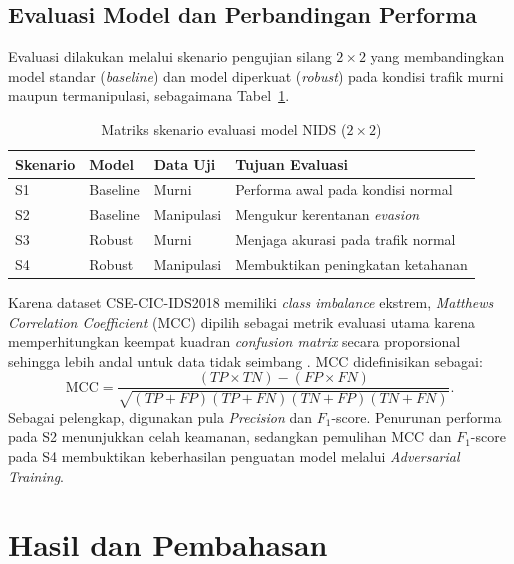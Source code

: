 \documentclass[10pt,twocolumn,a4paper]{extarticle}
\begin{document}
\subsection{Evaluasi Model dan Perbandingan Performa}
Evaluasi dilakukan melalui skenario pengujian silang $2\times 2$ yang membandingkan model standar (\textit{baseline}) dan model diperkuat (\textit{robust}) pada kondisi trafik murni maupun termanipulasi, sebagaimana Tabel~\ref{tab:skenario_2x2}.

\begin{table}[htbp]
\caption{Matriks skenario evaluasi model NIDS ($2\times 2$)}
\label{tab:skenario_2x2}
\centering
\footnotesize
\begin{tabularx}{\linewidth}{@{} l l l X @{}}
\toprule
\textbf{Skenario} & \textbf{Model} & \textbf{Data Uji} & \textbf{Tujuan Evaluasi} \\ \midrule
S1 & Baseline & Murni & Performa awal pada kondisi normal \\
S2 & Baseline & Manipulasi & Mengukur kerentanan \textit{evasion} \\
S3 & Robust & Murni & Menjaga akurasi pada trafik normal \\
S4 & Robust & Manipulasi & Membuktikan peningkatan ketahanan \\ \bottomrule
\end{tabularx}
\end{table}

Karena dataset CSE-CIC-IDS2018 memiliki \textit{class imbalance} ekstrem, \textit{Matthews Correlation Coefficient} (MCC) \citep{ref_matthews} dipilih sebagai metrik evaluasi utama karena memperhitungkan keempat kuadran \textit{confusion matrix} secara proporsional sehingga lebih andal untuk data tidak seimbang \citep{ref_chicco}. MCC didefinisikan sebagai:
\begin{equation}
\mathrm{MCC} = \frac{(TP\times TN) - (FP\times FN)}{\sqrt{(TP+FP)(TP+FN)(TN+FP)(TN+FN)}}.
\end{equation}
Sebagai pelengkap, digunakan pula \textit{Precision} dan $F_1$-score. Penurunan performa pada S2 menunjukkan celah keamanan, sedangkan pemulihan MCC dan $F_1$-score pada S4 membuktikan keberhasilan penguatan model melalui \textit{Adversarial Training}.

\section{Hasil dan Pembahasan}
\end{document}
